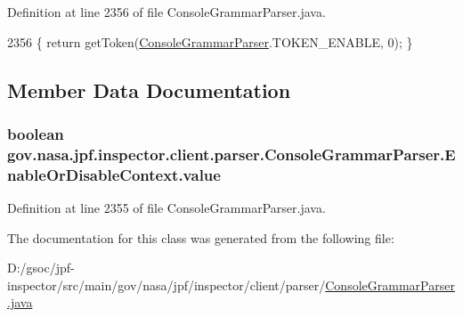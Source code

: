 Definition at line 2356 of file Console\+Grammar\+Parser.\+java.


\begin{DoxyCode}
2356 \{ \textcolor{keywordflow}{return} getToken(\hyperlink{classgov_1_1nasa_1_1jpf_1_1inspector_1_1client_1_1parser_1_1_console_grammar_parser_a03e28f396e991cff9d014f357ae220f3}{ConsoleGrammarParser}.TOKEN\_ENABLE, 0); \}
\end{DoxyCode}


\subsection{Member Data Documentation}
\subsubsection[{\texorpdfstring{value}{value}}]{\setlength{\rightskip}{0pt plus 5cm}boolean gov.\+nasa.\+jpf.\+inspector.\+client.\+parser.\+Console\+Grammar\+Parser.\+Enable\+Or\+Disable\+Context.\+value}\hypertarget{classgov_1_1nasa_1_1jpf_1_1inspector_1_1client_1_1parser_1_1_console_grammar_parser_1_1_enable_or_disable_context_a90d9102768769dc5e6c0dba0ee3f6adc}{}\label{classgov_1_1nasa_1_1jpf_1_1inspector_1_1client_1_1parser_1_1_console_grammar_parser_1_1_enable_or_disable_context_a90d9102768769dc5e6c0dba0ee3f6adc}


Definition at line 2355 of file Console\+Grammar\+Parser.\+java.



The documentation for this class was generated from the following file\+:\begin{DoxyCompactItemize}
\item 
D\+:/gsoc/jpf-\/inspector/src/main/gov/nasa/jpf/inspector/client/parser/\hyperlink{_console_grammar_parser_8java}{Console\+Grammar\+Parser.\+java}\end{DoxyCompactItemize}
